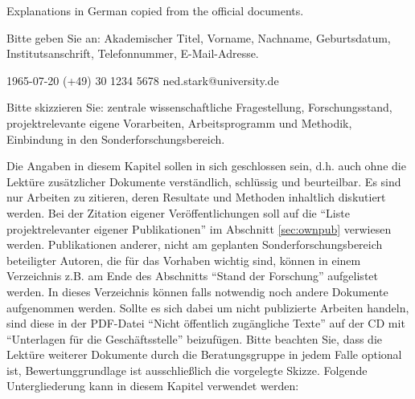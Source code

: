 
\notocsubsection{\pisg}

\begin{erklaerung}
Explanations in German copied from the official documents. %


Bitte geben Sie an: Akademischer Titel, Vorname, Nachname, Geburtsdatum, Institutsanschrift, Telefonnummer, E-Mail-Adresse.
\end{erklaerung}

\begin{giprenv}
{1965-07-20}
{\instn}
{\unia}
{\uniaaddress}
{(+49) 30 1234 5678}
{ned.stark@university.de}
\end{giprenv}

\notocsubsection{\prsum}
\begin{erklaerung}
  Bitte skizzieren Sie: zentrale wissenschaftliche Fragestellung,
  Forschungsstand, projektrelevante eigene Vorarbeiten,
  Arbeitsprogramm und Methodik, Einbindung in den
  Sonderforschungsbereich.

  Die Angaben in diesem Kapitel sollen in sich geschlossen sein,
  d.h. auch ohne die Lektüre zusätzlicher Dokumente verständlich,
  schlüssig und beurteilbar. Es sind nur Arbeiten zu zitieren, deren
  Resultate und Methoden inhaltlich diskutiert werden. Bei der
  Zitation eigener Veröffentlichungen soll auf die \enquote{Liste
    projektrelevanter eigener Publikationen} im Abschnitt
  \ref{sec:ownpub} verwiesen werden. Publikationen anderer, nicht am
  geplanten Sonderforschungsbereich beteiligter Autoren, die für das
  Vorhaben wichtig sind, können in einem Verzeichnis z.B. am Ende des
  Abschnitts \enquote{Stand der Forschung} aufgelistet werden.  In
  dieses Verzeichnis können falls notwendig noch andere Dokumente
  aufgenommen werden. Sollte es sich dabei um nicht publizierte
  Arbeiten handeln, sind diese in der PDF-Datei \enquote{Nicht
    öffentlich zugängliche Texte} auf der CD mit \enquote{Unterlagen
    für die Geschäftsstelle} beizufügen. Bitte beachten Sie, dass die
  Lektüre weiterer Dokumente durch die Beratungsgruppe in jedem Falle
  optional ist, Bewertunggrundlage ist ausschließlich die
  vorgelegte Skizze.  Folgende Untergliederung kann in diesem Kapitel
  verwendet werden:
\nocite{test2}
\end{erklaerung}
\notocsubsubsection{\resqu}

\blindtext \textcite{teil1}

\notocsubsubsection{\state}

